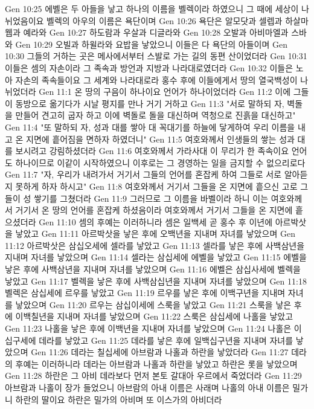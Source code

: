 Gen 10:25  에벨은 두 아들을 낳고 하나의 이름을 벨렉이라 하였으니 그 때에 세상이 나뉘었음이요 벨렉의 아우의 이름은 욕단이며
Gen 10:26  욕단은 알모닷과 셀렙과 하살마웹과 예라와
Gen 10:27  하도람과 우살과 디글라와
Gen 10:28  오발과 아비마엘과 스바와
Gen 10:29  오빌과 하윌라와 요밥을 낳았으니 이들은 다 욕단의 아들이며
Gen 10:30  그들의 거하는 곳은 메사에서부터 스발로 가는 길의 동편 산이었더라
Gen 10:31  이들은 셈의 자손이라 그 족속과 방언과 지방과 나라대로였더라
Gen 10:32  이들은 노아 자손의 족속들이요 그 세계와 나라대로라 홍수 후에 이들에게서 땅의 열국백성이 나뉘었더라
Gen 11:1  온 땅의 구음이 하나이요 언어가 하나이었더라
Gen 11:2  이에 그들이 동방으로 옮기다가 시날 평지를 만나 거기 거하고
Gen 11:3  "서로 말하되 자, 벽돌을 만들어 견고히 굽자 하고 이에 벽돌로 돌을 대신하며 역청으로 진흙을 대신하고"
Gen 11:4  "또 말하되 자, 성과 대를 쌓아 대 꼭대기를 하늘에 닿게하여 우리 이름을 내고 온 지면에 흩어짐을 면하자 하였더니"
Gen 11:5  여호와께서 인생들의 쌓는 성과 대를 보시려고 강림하셨더라
Gen 11:6  여호와께서 가라사대 이 무리가 한 족속이요 언어도 하나이므로 이같이 시작하였으니 이후로는 그 경영하는 일을 금지할 수 없으리로다
Gen 11:7  "자, 우리가 내려가서 거기서 그들의 언어를 혼잡케 하여 그들로 서로 알아듣지 못하게 하자 하시고"
Gen 11:8  여호와께서 거기서 그들을 온 지면에 흩으신 고로 그들이 성 쌓기를 그쳤더라
Gen 11:9  그러므로 그 이름을 바벨이라 하니 이는 여호와께서 거기서 온 땅의 언어를 혼잡케 하셨음이라 여호와께서 거기서 그들을 온 지면에 흩으셨더라
Gen 11:10  셈의 후예는 이러하니라 셈은 일백세 곧 홍수 후 이년에 아르박삿을 낳았고
Gen 11:11  아르박삿을 낳은 후에 오백년을 지내며 자녀를 낳았으며
Gen 11:12  아르박삿은 삼십오세에 셀라를 낳았고
Gen 11:13  셀라를 낳은 후에 사백삼년을 지내며 자녀를 낳았으며
Gen 11:14  셀라는 삼십세에 에벨을 낳았고
Gen 11:15  에벨을 낳은 후에 사백삼년을 지내며 자녀를 낳았으며
Gen 11:16  에벨은 삼십사세에 벨렉을 낳았고
Gen 11:17  벨렉을 낳은 후에 사백삼십년을 지내며 자녀를 낳았으며
Gen 11:18  벨렉은 삼십세에 르우를 낳았고
Gen 11:19  르우를 낳은 후에 이백구년을 지내며 자녀를 낳았으며
Gen 11:20  르우는 삼십이세에 스룩을 낳았고
Gen 11:21  스룩을 낳은 후에 이백칠년을 지내며 자녀를 낳았으며
Gen 11:22  스룩은 삼십세에 나홀을 낳았고
Gen 11:23  나홀을 낳은 후에 이백년을 지내며 자녀를 낳았으며
Gen 11:24  나홀은 이십구세에 데라를 낳았고
Gen 11:25  데라를 낳은 후에 일백십구년을 지내며 자녀를 낳았으며
Gen 11:26  데라는 칠십세에 아브람과 나홀과 하란을 낳았더라
Gen 11:27  데라의 후예는 이러하니라 데라는 아브람과 나홀과 하란을 낳았고 하란은 롯을 낳았으며
Gen 11:28  하란은 그 아비 데라보다 먼저 본토 갈대아 우르에서 죽었더라
Gen 11:29  아브람과 나홀이 장가 들었으니 아브람의 아내 이름은 사래며 나홀의 아내 이름은 밀가니 하란의 딸이요 하란은 밀가의 아비며 또 이스가의 아비더라

